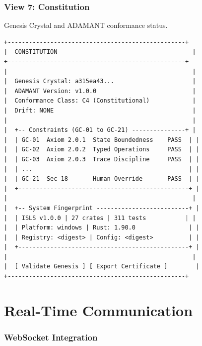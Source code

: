 \documentclass[11pt,a4paper,twoside]{article}
\begin{document}
\section{View 7: Constitution}\label{sec:constitution}

Genesis Crystal and ADAMANT conformance status.

\begin{lstlisting}[title={Constitution Layout}]
+--------------------------------------------------+
|  CONSTITUTION                                      |
+--------------------------------------------------+
|                                                    |
|  Genesis Crystal: a315ea43...                      |
|  ADAMANT Version: v1.0.0                           |
|  Conformance Class: C4 (Constitutional)            |
|  Drift: NONE                                       |
|                                                    |
|  +-- Constraints (GC-01 to GC-21) ---------------+ |
|  | GC-01  Axiom 2.0.1  State Boundedness    PASS  | |
|  | GC-02  Axiom 2.0.2  Typed Operations     PASS  | |
|  | GC-03  Axiom 2.0.3  Trace Discipline     PASS  | |
|  | ...                                            | |
|  | GC-21  Sec 18       Human Override       PASS  | |
|  +------------------------------------------------+ |
|                                                    |
|  +-- System Fingerprint --------------------------+ |
|  | ISLS v1.0.0 | 27 crates | 311 tests           | |
|  | Platform: windows | Rust: 1.90.0               | |
|  | Registry: <digest> | Config: <digest>          | |
|  +------------------------------------------------+ |
|                                                    |
|  [ Validate Genesis ] [ Export Certificate ]        |
+--------------------------------------------------+
\end{lstlisting}


\part{Real-Time Communication}\label{part:realtime}

\section{WebSocket Integration}\label{sec:ws}
\end{document}
